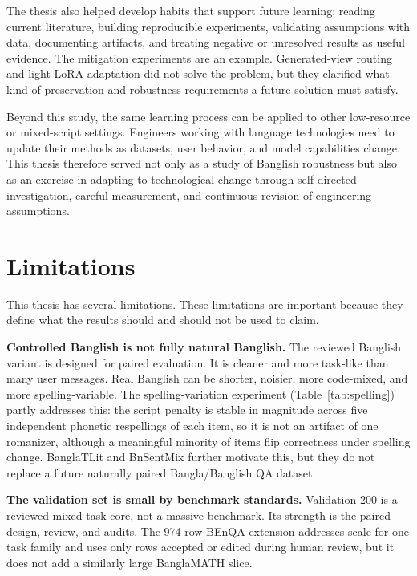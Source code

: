 The thesis also helped develop habits that support future learning: reading current literature, building reproducible experiments, validating assumptions with data, documenting artifacts, and treating negative or unresolved results as useful evidence. The mitigation experiments are an example. Generated-view routing and light LoRA adaptation did not solve the problem, but they clarified what kind of preservation and robustness requirements a future solution must satisfy.

Beyond this study, the same learning process can be applied to other low-resource or mixed-script settings. Engineers working with language technologies need to update their methods as datasets, user behavior, and model capabilities change. This thesis therefore served not only as a study of Banglish robustness but also as an exercise in adapting to technological change through self-directed investigation, careful measurement, and continuous revision of engineering assumptions.

\section{Limitations}

This thesis has several limitations. These limitations are important because they define what the results should and should not be used to claim.

\textbf{Controlled Banglish is not fully natural Banglish.} The reviewed Banglish variant is designed for paired evaluation. It is cleaner and more task-like than many user messages. Real Banglish can be shorter, noisier, more code-mixed, and more spelling-variable. The spelling-variation experiment (Table~\ref{tab:spelling}) partly addresses this: the script penalty is stable in magnitude across five independent phonetic respellings of each item, so it is not an artifact of one romanizer, although a meaningful minority of items flip correctness under spelling change. BanglaTLit and BnSentMix further motivate this, but they do not replace a future naturally paired Bangla/Banglish QA dataset.

\textbf{The validation set is small by benchmark standards.} Validation-200 is a reviewed mixed-task core, not a massive benchmark. Its strength is the paired design, review, and audits. The 974-row BEnQA extension addresses scale for one task family and uses only rows accepted or edited during human review, but it does not add a similarly large BanglaMATH slice.

